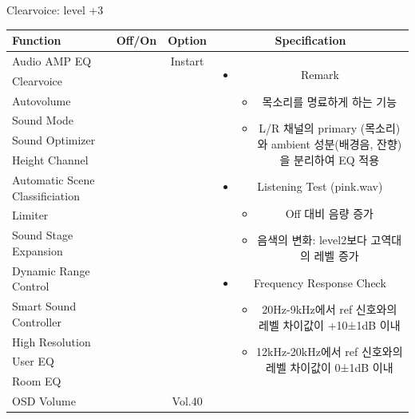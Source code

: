 \documentclass{beamer}
\begin{document}
\begin{frame}[t]{Clearvoice: level +3}
\begin{tiny}
\begin{tabular}{@{}lccc@{}}
\toprule
Function & Off/On & Option & Specification \\
\midrule
Audio AMP EQ & \color{black}{Off} & Instart &
\multirow{14}{60mm}{
\begin{itemize}
\item Remark
	\begin{itemize}
	\item 목소리를 명료하게 하는 기능
	\item L/R 채널의 primary (목소리)와 ambient 성분(배경음, 잔향)을 분리하여 EQ 적용
	\end{itemize}
\item Listening Test (pink.wav)
	\begin{itemize}
	\item Off 대비 음량 증가
	\item 음색의 변화: level2보다 고역대의 레벨 증가
	\end{itemize}
\item Frequency Response Check
  \begin{itemize}
  \item 20Hz-9kHz에서 ref 신호와의 레벨 차이값이 +10±1dB 이내
  \item 12kHz-20kHz에서 ref 신호와의 레벨 차이값이 0±1dB 이내
  \end{itemize}
\end{itemize}
} \\
Clearvoice & \color{blue}{On} & \color{blue}{+3} & \\
Autovolume & \color{black}{Off} & & \\
Sound Mode & \color{black}{Off} & & \\
Sound Optimizer & \color{black}{Off} & & \\
Height Channel & \color{black}{Off} & & \\
Automatic Scene Classificiation & \color{black}{Off} & & \\
Limiter & \color{black}{Off} & & \\
Sound Stage Expansion & \color{black}{Off} & & \\
Dynamic Range Control & \color{black}{Off} & & \\
Smart Sound Controller & \color{black}{Off} & & \\
High Resolution & \color{black}{Off} & & \\
User EQ & \color{black}{Off} & & \\
Room EQ & \color{black}{Off} & & \\
OSD Volume & \color{blue}{On} & Vol.40 & \\
\midrule
\end{tabular}
\end{tiny}


\end{frame}
\end{document}
